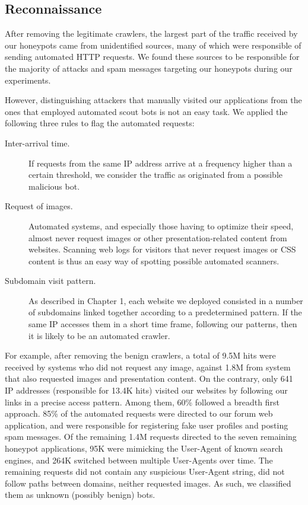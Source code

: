 \subsection{Reconnaissance}

After removing the legitimate crawlers, the largest part of the traffic received by our honeypots came from unidentified sources, many of which were responsible of sending automated HTTP requests. We found these sources to be responsible for the majority of attacks and spam messages targeting our honeypots during our experiments.

However, distinguishing attackers that manually visited our applications from the ones that employed automated scout bots is not an easy task. We applied the following three rules to flag the automated requests:

\begin{description}
\item[Inter-arrival time.] If requests from the same IP address arrive at a frequency higher than a certain threshold, we consider the traffic as originated from a possible malicious bot.
\item[Request of images.] Automated systems, and especially those having to optimize their speed, almost never request images or other presentation-related content from websites. Scanning web logs for visitors that never request images or CSS content is thus an easy way of spotting possible automated scanners.
\item[Subdomain visit pattern.] As described in Chapter 1, each website we deployed consisted in a number of subdomains linked together according to a predetermined pattern. If the same IP accesses them in a short time frame, following our patterns, then it is likely to be an automated crawler.
\end{description}

For example, after removing the benign crawlers, a total of 9.5M hits were received by systems who did not request any image, against 1.8M from system that also requested images and presentation content. On the contrary, only 641 IP addresses (responsible for 13.4K hits) visited our websites by following our links in a precise access pattern. Among them, 60\% followed a breadth first approach.
85\% of the automated requests were directed to our forum web application, and were responsible for registering fake user profiles and posting spam messages. Of the remaining 1.4M requests directed to the seven remaining honeypot applications, 95K were mimicking the User-Agent of known search engines, and 264K switched between multiple User-Agents over time. The remaining requests did not contain any suspicious User-Agent string, did not follow paths between domains, neither requested images. As such, we classified them as unknown (possibly benign) bots.

